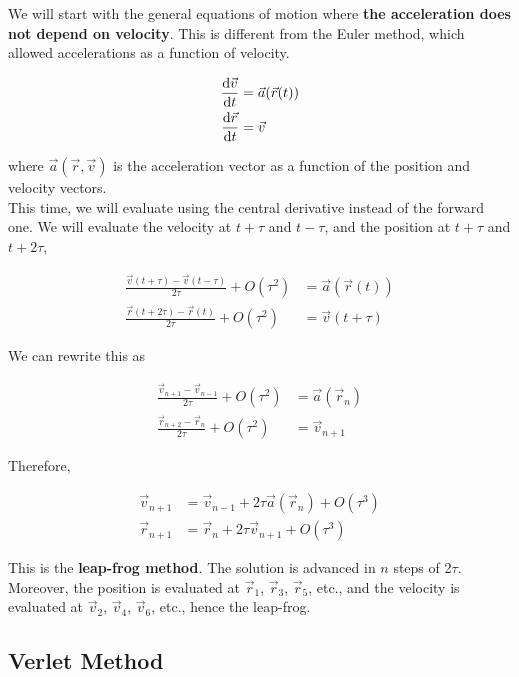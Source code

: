 \documentclass[]{article}
\begin{document}
We will start with the general equations of motion where \textbf{the acceleration does not depend on velocity}. This is different from the Euler method, which allowed accelerations as a function of velocity.

\begin{align*}
	\dv{\vec{v}}{t} &= \vec{a}(\vec{r}(t))\\
	\dv{\vec{r}}{t} &= \vec{v}
\end{align*}

where $\vec{a}(\vec{r}, \vec{v})$ is the acceleration vector as a function of the position and velocity vectors.\\

This time, we will evaluate using the central derivative instead of the forward one. We will evaluate the velocity at $t+\tau$ and $t-\tau$, and the position at $t+\tau$ and $t+2\tau$,

\begin{align*}
	\frac{\vec{v}(t + \tau)-\vec{v}(t - \tau)}{2\tau} + O(\tau^2) &= \vec{a}(\vec{r}(t))\\
	\frac{\vec{r}(t + 2\tau)-\vec{r}(t)}{2\tau} + O(\tau^2) &= \vec{v}(t + \tau)
\end{align*}

We can rewrite this as 

\begin{align*}
	\frac{\vec{v}_{n+1}-\vec{v}_{n-1}}{2\tau} + O(\tau^2) &= \vec{a}(\vec{r}_n)\\
	\frac{\vec{r}_{n+2}-\vec{r}_n}{2\tau} + O(\tau^2) &= \vec{v}_{n+1}
\end{align*}

Therefore,

\begin{align*}
	\vec{v}_{n+1} &= \vec{v}_{n -1} + 2\tau\vec{a}(\vec{r}_{n}) + O(\tau^3)\\
	\vec{r}_{n+1} &= \vec{r}_{n} + 2\tau\vec{v}_{n+1} + O(\tau^3)
\end{align*}

This is the \textbf{leap-frog method}. The solution is advanced in $n$ steps of 2$\tau$. Moreover, the position is evaluated at $\vec{r}_1$, $\vec{r}_3$, $\vec{r}_5$, etc., and the velocity is evaluated at $\vec{v}_2$, $\vec{v}_4$, $\vec{v}_6$, etc., hence the leap-frog.\\

\subsection{Verlet Method}\bigbreak
\end{document}
